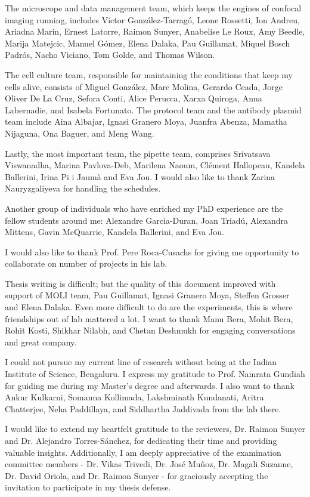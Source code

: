 \begin{Acknowledgements}
	The microscope and data management team, which keeps the engines of confocal imaging running, includes Víctor González-Tarragó, Leone Rossetti, Ion Andreu, Ariadna Marin, Ernest Latorre, Raimon Sunyer, Anabelise Le Roux, Amy Beedle, Marija Matejcic, Manuel Gómez, Elena Dalaka, Pau Guillamat, Miquel Bosch Padrós, Nacho Viciano, Tom Golde, and Thomas Wilson.
	
	The cell culture team, responsible for maintaining the conditions that keep my cells alive, consists of Miguel González, Marc Molina, Gerardo Ceada, Jorge Oliver De La Cruz, Sefora Conti, Alice Perucca, Xarxa Quiroga, Anna Labernadie, and Isabela Fortunato. The protocol team and the antibody plasmid team include Aina Albajar, Ignasi Granero Moya, Juanfra Abenza, Mamatha Nijaguna, Ona Baguer, and Meng Wang.
	
	Lastly, the most important team, the pipette team, comprises Srivatsava Viswanadha, Marina Pavlova-Deb, Marilena Naoum, Clément Hallopeau, Kandela Ballerini, Irina Pi i Jaumà and Eva Jou. I would also like to thank Zarina Nauryzgaliyeva for handling the schedules.
	
	Another group of individuals who have enriched my PhD experience are the fellow students around me: Alexandre Garcia-Duran, Joan Triadú, Alexandra Mittens, Gavin McQuarrie, Kandela Ballerini, and Eva Jou.
	
	I would also like to thank Prof. Pere Roca-Cusachs for giving me opportunity to collaborate on number of projects in his lab.
	
	Thesis writing is difficult; but the quality of this document improved with support of MOLI team, Pau Guillamat, Ignasi Granero Moya, Steffen Grosser and Elena Dalaka. Even more difficult to do are the experiments, this is where friendships out of lab mattered a lot. I want to thank Manu Bera, Mohit Bera, Rohit Kosti, Shikhar Nilabh, and Chetan Deshmukh for engaging conversations and great company.
	
	I could not pursue my current line of research without being at the Indian Institute of Science, Bengaluru. I express my gratitude to Prof. Namrata Gundiah for guiding me during my Master's degree and afterwards. I also want to thank Ankur Kulkarni, Somanna Kollimada, Lakshminath Kundanati, Aritra Chatterjee, Neha Paddillaya, and Siddhartha Jaddivada from the lab there.
	
	I would like to extend my heartfelt gratitude to the reviewers, Dr. Raimon Sunyer and Dr. Alejandro Torres-Sánchez, for dedicating their time and providing valuable insights. Additionally, I am deeply appreciative of the examination committee members - Dr. Vikas Trivedi, Dr. José Muñoz, Dr. Magali Suzanne, Dr. David Oriola, and Dr. Raimon Sunyer - for graciously accepting the invitation to participate in my thesis defense.
	

\end{Acknowledgements}
